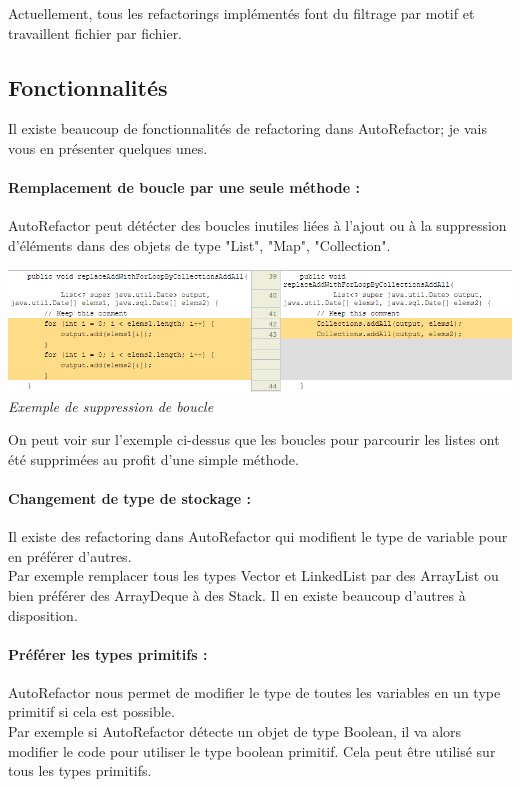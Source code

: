 \documentclass[a4paper,twoside,12pt,openright]{report}
\begin{document}
Actuellement, tous les refactorings implémentés font du filtrage par motif et travaillent fichier par fichier.\\

\subsection{Fonctionnalités}
Il existe beaucoup de fonctionnalités de refactoring dans AutoRefactor; je vais vous en présenter quelques unes.\\

\paragraph{Remplacement de boucle par une seule méthode :}
AutoRefactor peut détécter des boucles inutiles liées à l'ajout ou à la suppression d'éléments dans des objets de type "List", "Map", "Collection".\\

\begin{center}
\includegraphics[scale=0.7]{Image/SupBoucle.png}\\
\itshape{Exemple de suppression de boucle \cite{ref10}}
\end{center}


On peut voir sur l'exemple ci-dessus que les boucles pour parcourir les listes ont été supprimées au profit d'une simple méthode.\\

\paragraph{Changement de type de stockage :}
Il existe des refactoring dans AutoRefactor qui modifient le type de variable pour en préférer d'autres.\\
Par exemple remplacer tous les types Vector et LinkedList par des ArrayList ou bien préférer des ArrayDeque à des Stack. Il en existe beaucoup d'autres à disposition.\\

\paragraph{Préférer les types primitifs :}
AutoRefactor nous permet de modifier le type de toutes les variables en un type primitif si cela est possible.\\
Par exemple si AutoRefactor détecte un objet de type Boolean, il va alors modifier le code pour utiliser le type boolean primitif. Cela peut être utilisé sur tous les types primitifs.\\
\end{document}
